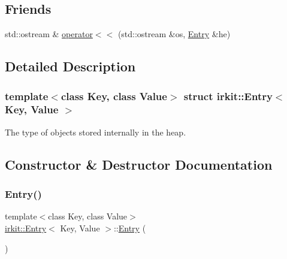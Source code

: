 \subsection*{Friends}
\begin{DoxyCompactItemize}
\item 
std\+::ostream \& \mbox{\hyperlink{structirkit_1_1Entry_a885f1645de32df3dbfbf9f2f47f7ea1f}{operator$<$$<$}} (std\+::ostream \&os, \mbox{\hyperlink{structirkit_1_1Entry}{Entry}} \&he)
\end{DoxyCompactItemize}


\subsection{Detailed Description}
\subsubsection*{template$<$class Key, class Value$>$\newline
struct irkit\+::\+Entry$<$ Key, Value $>$}

The type of objects stored internally in the heap. 

\subsection{Constructor \& Destructor Documentation}
\mbox{\label{structirkit_1_1Entry_ab8d6ae4f3f3ff0c1934543f2eca895ea}} 
\subsubsection{\texorpdfstring{Entry()}{Entry()}\hspace{0.1cm}{\footnotesize\ttfamily [1/2]}}
{\footnotesize\ttfamily template$<$class Key, class Value$>$ \\
\mbox{\hyperlink{structirkit_1_1Entry}{irkit\+::\+Entry}}$<$ Key, Value $>$\+::\mbox{\hyperlink{structirkit_1_1Entry}{Entry}} (\begin{DoxyParamCaption}{ }\end{DoxyParamCaption})\hspace{0.3cm}{\ttfamily [default]}}

\mbox{\label{structirkit_1_1Entry_afe9a7f9975902c4622115176169bc80a}} 
